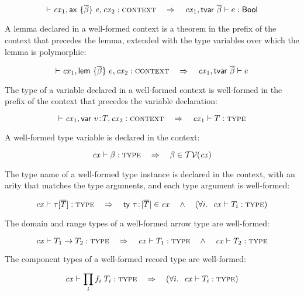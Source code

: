 \begin{theorem}\label{thm-ax-wt}
\[
\vdash\mathit{cx}_1,\mathsf{ax}\ \{\overline{\beta}\}\ e,\mathit{cx}_2:\textsc{context}\ \ \ \Rightarrow\ \ \
\mathit{cx}_1,\mathsf{tvar}\ \overline{\beta}\vdash e:\mathsf{Bool}
\]
\end{theorem}

A lemma declared in a well-formed context is a theorem in the prefix of the
context that precedes the lemma, extended with the type variables over which
the lemma is polymorphic:

\begin{theorem}\label{thm-lem-theo}
\[
\vdash\mathit{cx}_1,\mathsf{lem}\ \{\overline{\beta}\}\ e,\mathit{cx}_2:\textsc{context}\ \ \ \Rightarrow\ \ \
\mathit{cx}_1,\mathsf{tvar}\ \overline{\beta}\vdash e
\]
\end{theorem}

The type of a variable declared in a well-formed context is well-formed in the
prefix of the context that precedes the variable declaration:

\begin{theorem}\label{thm-var-type-wf}
\[
\cxwf{\cx_1,\vdecO,\cx_2}\ \ \IMPLIES\ \ \isty{\cx_1}{\typ}
\]
\end{theorem}

A well-formed type variable is declared in the context:

\begin{theorem}\label{thm-tvar-inv}
\[
\istyO{\tvar}\ \ \IMPLIES\ \ \tvar\in\cxtvarO
\]
\end{theorem}

The type name of a well-formed type instance is declared in the context, with
an arity that matches the type arguments, and each type argument is
well-formed:

\begin{theorem}\label{thm-tinst-inv}
\[
\mathit{cx}\vdash\tau[\overline{T}]:\textsc{type}
\ \ \ \Rightarrow\ \ \
\mathsf{ty}\ \tau\!:\!|\overline{T}|\in\mathit{cx}
\ \ \ \wedge\ \ \
(\forall i.\ \ \mathit{cx}\vdash T_i:\textsc{type})
\]
\end{theorem}

The domain and range types of a well-formed arrow type are well-formed:

\begin{theorem}\label{thm-tarr-inv}
\[
\istyO{\tarrO}\ \ \IMPLIES\ \ \istyO{\typ_1}\ \ \AND\ \ \istyO{\typ_2}
\]
\end{theorem}

The component types of a well-formed record type are well-formed:

\begin{theorem}\label{thm-trec-inv}
\[
\istyO{\trecO}\ \ \IMPLIES\ \ (\FORALL{i}{\istyO{\typ_i}})
\]
\end{theorem}


